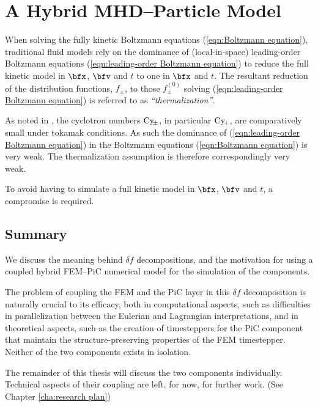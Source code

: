 \chapter{A Hybrid MHD--Particle Model}\label{cha:delta f corrections}
    When solving the fully kinetic Boltzmann equations (\ref{eqn:Boltzmann equation}), traditional fluid models rely on the dominance of (local-in-space) leading-order Boltzmann equations (\ref{eqn:leading-order Boltzmann equation}) to reduce the full kinetic model in $\bfx$, $\bfv$ and $t$ to one in $\bfx$ and $t$. The resultant reduction of the distribution functions, $f_{\pm}$, to those $f_{\pm}^{(0)}$ solving (\ref{eqn:leading-order Boltzmann equation}) is referred to as \emph{``thermalization''}.
    
    As noted in \cite{addendum_I}, the cyclotron numbers $\mathrm{Cy}\!_{\pm}$, in particular $\mathrm{Cy}\!_{+}$, are comparatively small under tokamak conditions. As such the dominance of (\ref{eqn:leading-order Boltzmann equation}) in the Boltzmann equations (\ref{eqn:Boltzmann equation}) is very weak. The thermalization assumption is therefore correspondingly very weak.

    To avoid having to simulate a full kinetic model in $\bfx$, $\bfv$ and $t$, a compromise is required.


    
    
    
    


    \section*{Summary}
        We discuss the meaning behind $\delta\!f$ decompositions, and the motivation for using a coupled hybrid FEM--PiC numerical model for the simulation of the components.
        
        The problem of coupling the FEM and the PiC layer in this $\delta\!f$ decomposition is naturally crucial to its efficacy, both in computational aspects, such as difficulties in parallelization between the Eulerian and Lagrangian interpretations, and in theoretical aspects, such as the creation of timesteppers for the PiC component that maintain the structure-preserving properties of the FEM timestepper. Neither of the two components exists in isolation.
        
        The remainder of this thesis will discuss the two components individually. Technical aspects of their coupling are left, for now, for further work. (See Chapter \ref{cha:research plan})
    